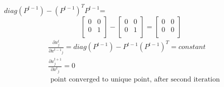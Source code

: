 \documentclass[conference]{IEEEtran}
\begin{document}
$diag(P^{t-1})-(P^{t-1})^TP^{t-1}$=\[
\begin{bmatrix}
 0     & 0 \\
  0        &  1 \\
\end{bmatrix}
-
\begin{bmatrix}
 0      & 0 \\
  0     &  1 \\
\end{bmatrix}
=
\begin{bmatrix}
 0      & 0 \\
  0       &  0 \\
\end{bmatrix}
\]
\begin{align*}
& \frac{\partial x^t_j}{\partial {x^{t-1}}_j}= diag(P^{t-1})-P^{t-1}(P^{t-1})^T= constant\\
& \frac{\partial x^{t+1}_j}{\partial {x^{t}}_j}=0 \\
& \text{ point converged to unique point, after second iteration} 
\end{align*}
\end{document}
